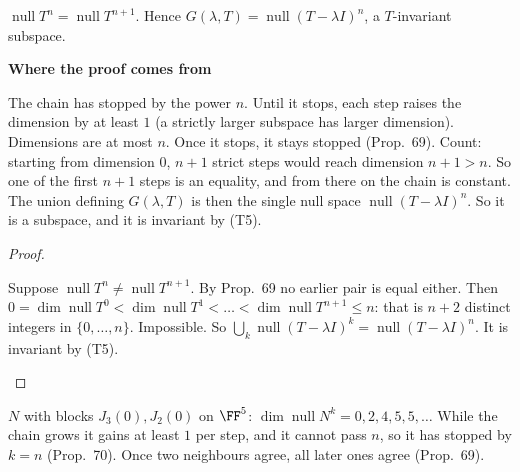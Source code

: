 \documentclass[10pt]{scrartcl}
\newenvironment{fig}{\par\needspace{9\baselineskip}\medskip\begin{center}}{\end{center}\medskip}
\newcommand{\figcap}[1]{\par\vspace{3pt}\begin{minipage}{0.86\linewidth}\small\centering #1\end{minipage}}
\DeclareMathOperator{\nul}{null}
\newenvironment{motive}{\begin{mdframed}[style=thinkbox]\textbf{\color{OliveGreen!75!black}Where the proof comes from}\begin{description}[leftmargin=0.9em,labelindent=0pt,itemsep=2pt,topsep=2pt,font=\normalfont\bfseries\color{OliveGreen!70!black}]}{\end{description}\end{mdframed}}
\newenvironment{steps}{\begin{enumerate}[label=\arabic*.,leftmargin=1.5em,itemsep=2pt,topsep=2pt]}{\end{enumerate}}
\begin{document}
\begin{proposition*}
  $\nul T^n=\nul T^{n+1}$. Hence $G(\lambda,T)=\nul(T-\lambda I)^n$, a $T$-invariant subspace.
\end{proposition*}
\begin{motive}
  \ii[Want.] The chain has stopped by the power $n$.
  \ii[Know.] Until it stops, each step raises the dimension by at least $1$ (a strictly larger subspace has larger dimension). Dimensions are at most $n$. Once it stops, it stays stopped (Prop.~69).
   Count: starting from dimension $0$, $n+1$ strict steps would reach dimension $n+1>n$. So one of the first $n+1$ steps is an equality, and from there on the chain is constant.
   The union defining $G(\lambda,T)$ is then the single null space $\nul(T-\lambda I)^n$. So it is a subspace, and it is invariant by (T5).
\end{motive}
\begin{proof}
  \begin{steps}
    \ii Suppose $\nul T^n\ne\nul T^{n+1}$. By Prop.~69 no earlier pair is equal either.
    \ii Then $0=\dim\nul T^0<\dim\nul T^1<\dots<\dim\nul T^{n+1}\le n$: that is $n+2$ distinct integers in $\{0,\dots,n\}$. Impossible.
    \ii So $\bigcup_k\nul(T-\lambda I)^k=\nul(T-\lambda I)^n$. It is invariant by (T5).
  \end{steps}
\end{proof}
\begin{fig}
\figcap{$N$ with blocks $J_3(0),J_2(0)$ on $\FF^5$: $\dim\nul N^k=0,2,4,5,5,\dots$ While the chain grows it gains at least $1$ per step, and it cannot pass $n$, so it has stopped by $k=n$ (Prop.~70). Once two neighbours agree, all later ones agree (Prop.~69).}
\end{fig}
\end{document}
